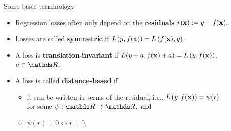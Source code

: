 \documentclass[11pt,compress,t,notes=noshow, xcolor=table]{beamer}
\begin{document}
\begin{vbframe}{Some basic terminology}


\begin{itemize}
  \small
  \item Regression losses often only depend on the \textbf{residuals}
  $r(\mathbf{x}) := y - f(\mathbf{x}).$
  \item Losses are called \textbf{symmetric} if $L\left(y, f(\mathbf{x})\right) = L\left(f(\mathbf{x}), y\right)$. 
  \item A loss is \textbf{translation-invariant} if $L(y + a, f(\mathbf{x}) + a) = L\left(y, f(\mathbf{x})\right)$, 
  $a \in \R$.
  \item A loss is called \textbf{distance-based} if
  \begin{itemize}
    \small
    \item it can be written in terms of the residual, i.e., 
    $L\left(y, f(\mathbf{x})\right) = \psi (r)$ \\for some $\psi: \R \to \R, ~ \text{and}$
    \item $\psi(r) = 0 \Leftrightarrow r = 0$.
  \end{itemize}
\end{itemize}

\vfill


\end{vbframe}
\end{document}
